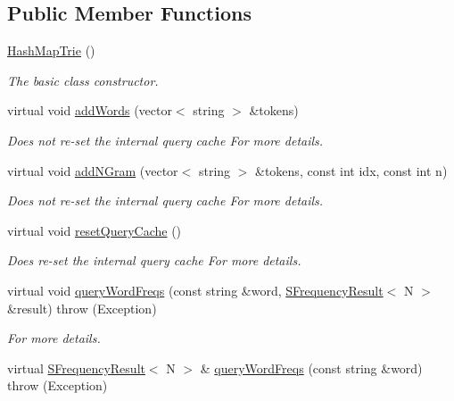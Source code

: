 \subsection*{Public Member Functions}
\begin{DoxyCompactItemize}
\item 
\hyperlink{classtries_1_1_hash_map_trie_a93d7512778a272845598ce8863c1eec4}{Hash\+Map\+Trie} ()
\begin{DoxyCompactList}\small\item\em The basic class constructor. \end{DoxyCompactList}\item 
virtual void \hyperlink{classtries_1_1_hash_map_trie_ae1f930f846bf91418bc9f295756506d9}{add\+Words} (vector$<$ string $>$ \&tokens)
\begin{DoxyCompactList}\small\item\em Does not re-\/set the internal query cache For more details. \end{DoxyCompactList}\item 
virtual void \hyperlink{classtries_1_1_hash_map_trie_a163ec5519b0b1842e65fbb77ed53fe1a}{add\+N\+Gram} (vector$<$ string $>$ \&tokens, const int idx, const int n)
\begin{DoxyCompactList}\small\item\em Does not re-\/set the internal query cache For more details. \end{DoxyCompactList}\item 
virtual void \hyperlink{classtries_1_1_hash_map_trie_acd9d79668a9ceb0093bb42aa43eb6546}{reset\+Query\+Cache} ()
\begin{DoxyCompactList}\small\item\em Does re-\/set the internal query cache For more details. \end{DoxyCompactList}\item 
virtual void \hyperlink{classtries_1_1_hash_map_trie_a7754f7cda3e36d740d9853dcef47338f}{query\+Word\+Freqs} (const string \&word, \hyperlink{structtries_1_1_s_frequency_result}{S\+Frequency\+Result}$<$ N $>$ \&result)  throw (\+Exception)
\begin{DoxyCompactList}\small\item\em For more details. \end{DoxyCompactList}\item 
virtual \hyperlink{structtries_1_1_s_frequency_result}{S\+Frequency\+Result}$<$ N $>$ \& \hyperlink{classtries_1_1_hash_map_trie_af2bdd70e8c6a211afd2ed931047b0ce2}{query\+Word\+Freqs} (const string \&word)  throw (\+Exception)

\end{DoxyCompactItemize}
